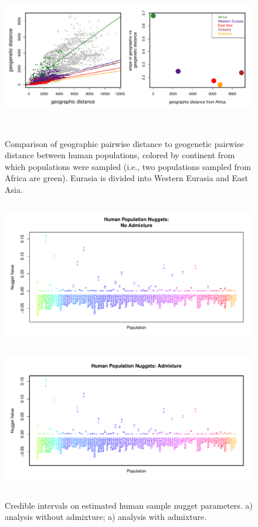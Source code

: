 \documentclass[10pt,letterpaper]{article}
\begin{document}
\begin{figure}
	\centering
		{\includegraphics[width=6in,height=2.5in]{../figs/globetrotter/globe_NoAd_dist_decay.pdf}}
	\caption{Comparison of geographic pairwise distance to geogenetic pairwise distance between human populations, colored by continent from which populations were sampled (i.e., two populations sampled from Africa are green).  Eurasia is divided into Western Eurasia and East Asia.}
\label{sfig:globe_noad_distcomp}
\end{figure}

\clearpage

\begin{figure}
\centering
	\subcaptionbox{\label{globe_noad_nugg}}
		{\includegraphics[width=5in,height=2.5in]{../figs/globetrotter/globe_NoAd_nugget.pdf}}
	\subcaptionbox{\label{globe_ad_nugg}}
		{\includegraphics[width=5in,height=2.5in]{../figs/globetrotter/globe_Ad_nugget.pdf}}
	\caption{Credible intervals on estimated human sample nugget parameters. a) analysis without admixture; a) analysis with admixture.}
	\label{sfig:globe_nuggs}
\end{figure}
\end{document}
